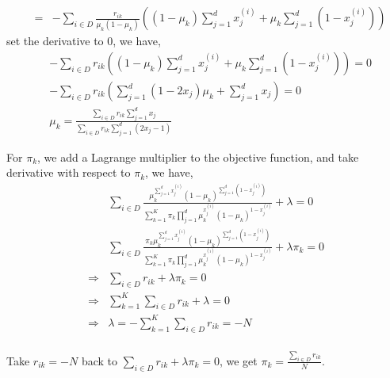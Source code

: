 \documentclass[12pt]{article}
\begin{document}
\begin{enumerate}
\begin{eqnarray}
        \\ &=& -\sum_{i \in D} \frac{r_{ik}}{\mu_k (1 - \mu_k)} ((1-\mu_k)\sum_{j=1}^{d} x^{(i)}_j + \mu_k \sum_{j=1}^{d} (1 - x^{(i)}_j)) \nonumber
    \end{eqnarray}
    set the derivative to 0, we have,
    \begin{align}
        & -\sum_{i \in D} r_{ik} ((1-\mu_k)\sum_{j=1}^{d} x^{(i)}_j + \mu_k \sum_{j=1}^{d} (1 - x^{(i)}_j)) = 0 \nonumber\\
        & -\sum_{i \in D} r_{ik} (\sum_{j=1}^{d} (1 -2 x_j) \mu_k + \sum_{j=1}^{d} x_j) = 0  \nonumber\\
        & \mu_k = \frac{\sum_{i \in D} r_{ik} \sum_{j=1}^{d} x_j}{\sum_{i \in D} r_{ik} \sum _{j=1}^{d} (2 x_j - 1)} \nonumber
    \end{align}

    For $\pi_k$, we add a Lagrange multiplier to the objective function, and take derivative with respect to $\pi_k$, we have,
    \begin{align}
        & \sum_{i \in D} \frac{\mu_k ^{ \sum_{j=1}^{d} x_j^{(i)} } (1-\mu_k)^{ \sum_{j=1}^{d} (1 - x_j^{(i)})}}{ \sum_{k=1}^K \pi_k \prod_{j=1}^d \mu_{k}^{x^{(i)}_j} (1-\mu_k)^{1-x^{(i)}_j} } + \lambda = 0 \nonumber \\
        & \sum_{i \in D} \frac{ \pi_k \mu_k ^{ \sum_{j=1}^{d} x_j^{(i)} } (1-\mu_k)^{ \sum_{j=1}^{d} (1 - x_j^{(i)})}}{ \sum_{k=1}^K \pi_k \prod_{j=1}^d \mu_{k}^{x^{(i)}_j} (1-\mu_k)^{1-x^{(i)}_j} } + \lambda \pi_k = 0 \nonumber \\
        \Rightarrow & \sum_{i \in D} r_{ik} + \lambda \pi_k = 0  \\ 
        \Rightarrow & \sum_{k=1}^K \sum_{i \in D} r_{ik} + \lambda = 0 \nonumber \\
        \Rightarrow & \lambda = -\sum_{k=1}^K \sum_{i \in D} r_{ik} = -N \nonumber \\
    \end{align}

    Take $r_{ik} = -N $ back to $\sum_{i \in D} r_{ik} + \lambda \pi_k = 0$, we get $\pi_k = \frac{\sum_{i \in D} r_{ik}}{N}$.


\end{enumerate}
\end{document}
